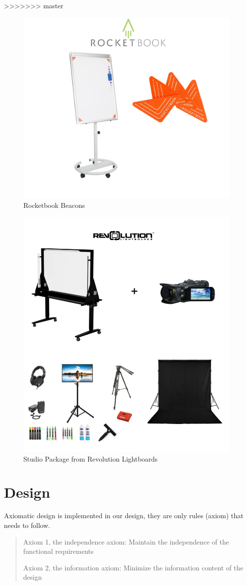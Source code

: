 \documentclass[a4paper]{jpconf}
\begin{document}
>>>>>>> master

	\begin{figure}
		\centering
		\includegraphics[width=0.7\linewidth]{becons.png}
		\caption{Rocketbook Beacons \cite{Rocketbook}}
		\label{fig:ROCK}
	\end{figure}
	
	\begin{figure}
		\centering
		\includegraphics[width=0.7\linewidth]{Revolution.png}
		\caption{ Studio Package from Revolution Lightboards \cite{Revolution}}
		\label{fig:REV}
	\end{figure}
	
	
	
	
	
	
	\section{Design}
	Axiomatic design is implemented in our design, they are only rules (axiom) that needs to follow\cite{suh2001axiomatic}.  
	\begin{quote}
		Axiom 1, the independence axiom:
		Maintain the independence of the functional requirements
		
		Axiom 2, the information axiom:
		Minimize the information content of the design
	\end{quote}
	
\end{document}
